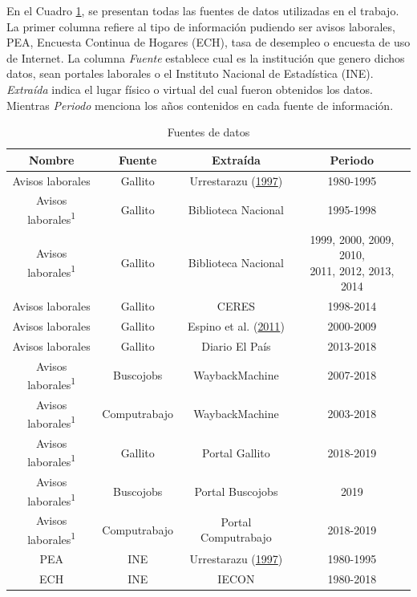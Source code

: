 \documentclass[12pt,oneside]{reedthesis}
\begin{document}
En el Cuadro \ref{tab:fuentes}, se presentan todas las fuentes de datos utilizadas en el trabajo. La primer columna refiere al tipo de información pudiendo ser avisos laborales, PEA, Encuesta Continua de Hogares (ECH), tasa de desempleo o encuesta de uso de Internet. La columna \emph{Fuente} establece cual es la institución que genero dichos datos, sean portales laborales o el Instituto Nacional de Estadística (INE). \emph{Extraída} indica el lugar físico o virtual del cual fueron obtenidos los datos. Mientras \emph{Periodo} menciona los años contenidos en cada fuente de información.
\begin{table}[!h]

\caption{\label{tab:fuentes}Fuentes de datos}
\centering
\fontsize{12}{14}\selectfont
\begin{threeparttable}
\begin{tabular}[t]{cccc}
\toprule
Nombre & Fuente & Extraída & Periodo\\
\midrule
Avisos laborales & Gallito & Urrestarazu (\protect\hyperlink{ref-Urrestarazu1997}{1997}) & 1980-1995\\
Avisos laborales\textsuperscript{1} & Gallito & Biblioteca Nacional & 1995-1998\\
Avisos laborales\textsuperscript{1} & Gallito & Biblioteca Nacional & \makecell[l]{1999, 2000, 2009, 2010,\\ 2011, 2012, 2013, 2014}\\
Avisos laborales & Gallito & CERES & 1998-2014\\
Avisos laborales & Gallito & Espino et al. (\protect\hyperlink{ref-Alma2011}{2011}) & 2000-2009\\
\addlinespace
Avisos laborales & Gallito & Diario El País & 2013-2018\\
Avisos laborales\textsuperscript{1} & Buscojobs & WaybackMachine & 2007-2018\\
Avisos laborales\textsuperscript{1} & Computrabajo & WaybackMachine & 2003-2018\\
Avisos laborales\textsuperscript{1} & Gallito & Portal Gallito & 2018-2019\\
Avisos laborales\textsuperscript{1} & Buscojobs & Portal Buscojobs & 2019\\
\addlinespace
Avisos laborales\textsuperscript{1} & Computrabajo & Portal Computrabajo & 2018-2019\\
PEA & INE & Urrestarazu (\protect\hyperlink{ref-Urrestarazu1997}{1997}) & 1980-1995\\
ECH & INE & IECON & 1980-2018\\

\end{tabular}
\end{threeparttable}
\end{table}
\end{document}
